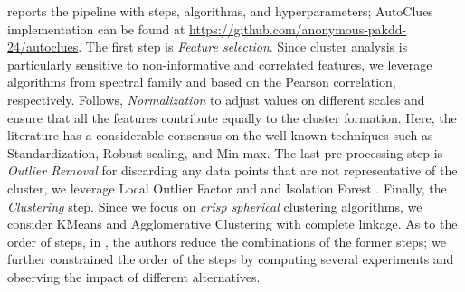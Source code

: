  reports the pipeline with steps, algorithms, and hyperparameters; AutoClues implementation can be found at \url{https://github.com/anonymous-pakdd-24/autoclues}.
The first step is \textit{Feature selection}. 
Since cluster analysis is particularly sensitive to non-informative and correlated features, we leverage algorithms from spectral family and based on the Pearson correlation, respectively. 
Follows, \textit{Normalization} to adjust values on different scales and ensure that all the features contribute equally to the cluster formation.
Here, the literature has a considerable consensus on the well-known techniques such as Standardization, Robust scaling, and Min-max.
The last pre-processing step is \textit{Outlier Removal} for discarding any data points that are not representative of the cluster, we leverage Local Outlier Factor \cite{breunig2000lof} and and Isolation Forest \cite{liu2012isolation}.
Finally, the \textit{Clustering} step.
Since we focus on \textit{crisp spherical} clustering algorithms, we consider KMeans \cite{arthur2006k} and Agglomerative Clustering \cite{murtagh2017algorithms} with complete linkage.
As to the order of steps, in \cite{giovanelli2022data}, the authors reduce the combinations of the former steps; we further constrained the order of the steps by computing several experiments and observing the impact of different alternatives.

